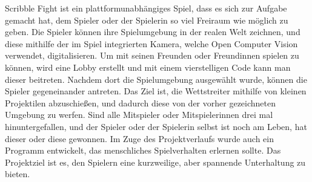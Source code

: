 Scribble Fight ist ein plattformunabhängiges Spiel, dass es sich zur Aufgabe gemacht hat, dem Spieler oder der Spielerin so viel Freiraum wie möglich zu geben.
Die Spieler können ihre Spielumgebung in der realen Welt zeichnen, und diese mithilfe der im Spiel integrierten Kamera, welche Open Computer Vision verwendet, digitalisieren.
Um mit seinen Freunden oder Freundinnen spielen zu können, wird eine Lobby erstellt und mit einem vierstelligen Code kann man dieser beitreten.
Nachdem dort die Spielumgebung ausgewählt wurde, können die Spieler gegeneinander antreten.
Das Ziel ist, die Wettstreiter mithilfe von kleinen Projektilen abzuschießen, und dadurch diese von der vorher gezeichneten Umgebung zu werfen.
Sind alle Mitspieler oder Mitspielerinnen drei mal hinuntergefallen, und der Spieler oder der Spielerin selbst ist noch am Leben, hat dieser oder diese gewonnen.
Im Zuge des Projektverlaufs wurde auch ein Programm entwickelt, das menschliches Spielverhalten erlernen sollte.
Das Projektziel ist es, den Spielern eine kurzweilige, aber spannende Unterhaltung zu bieten.
